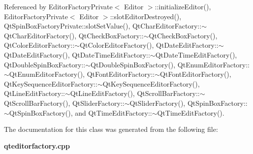 Referenced by Editor\+Factory\+Private$<$ Editor $>$\+::initialize\+Editor(), Editor\+Factory\+Private$<$ Editor $>$\+::slot\+Editor\+Destroyed(), Qt\+Spin\+Box\+Factory\+Private\+::slot\+Set\+Value(), Qt\+Char\+Editor\+Factory\+::$\sim$\+Qt\+Char\+Editor\+Factory(), Qt\+Check\+Box\+Factory\+::$\sim$\+Qt\+Check\+Box\+Factory(), Qt\+Color\+Editor\+Factory\+::$\sim$\+Qt\+Color\+Editor\+Factory(), Qt\+Date\+Edit\+Factory\+::$\sim$\+Qt\+Date\+Edit\+Factory(), Qt\+Date\+Time\+Edit\+Factory\+::$\sim$\+Qt\+Date\+Time\+Edit\+Factory(), Qt\+Double\+Spin\+Box\+Factory\+::$\sim$\+Qt\+Double\+Spin\+Box\+Factory(), Qt\+Enum\+Editor\+Factory\+::$\sim$\+Qt\+Enum\+Editor\+Factory(), Qt\+Font\+Editor\+Factory\+::$\sim$\+Qt\+Font\+Editor\+Factory(), Qt\+Key\+Sequence\+Editor\+Factory\+::$\sim$\+Qt\+Key\+Sequence\+Editor\+Factory(), Qt\+Line\+Edit\+Factory\+::$\sim$\+Qt\+Line\+Edit\+Factory(), Qt\+Scroll\+Bar\+Factory\+::$\sim$\+Qt\+Scroll\+Bar\+Factory(), Qt\+Slider\+Factory\+::$\sim$\+Qt\+Slider\+Factory(), Qt\+Spin\+Box\+Factory\+::$\sim$\+Qt\+Spin\+Box\+Factory(), and Qt\+Time\+Edit\+Factory\+::$\sim$\+Qt\+Time\+Edit\+Factory().



The documentation for this class was generated from the following file\+:\begin{DoxyCompactItemize}
\item 
{\bf qteditorfactory.\+cpp}\end{DoxyCompactItemize}
